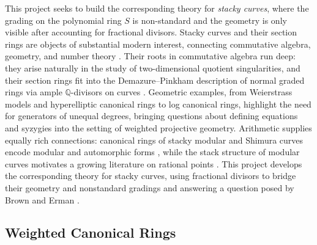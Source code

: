 \documentclass[11pt,reqno]{amsart}
\theoremstyle{remark}
\newcommand{\QQ}{\mathbb{Q}}
\begin{document}
This project seeks to build the corresponding theory for \emph{stacky curves}, where the grading on the polynomial ring $S$ is non-standard and the geometry is only visible after accounting for fractional divisors. Stacky curves and their section rings are objects of substantial modern interest, connecting commutative algebra, geometry, and number theory \cite{abramovichVistoli02,cadman07,AGV08,voightZurieckBrown22}. Their roots in commutative algebra run deep: they arise naturally in the study of two-dimensional quotient singularities, and their section rings fit into the Demazure--Pinkham description of normal graded rings via ample $\QQ$-divisors on curves \cite{pinkham77,demazure88,watanabe81}. Geometric examples, from Weierstrass models and hyperelliptic canonical rings to log canonical rings, highlight the need for generators of unequal degrees, bringing questions about defining equations and syzygies into the setting of weighted projective geometry. Arithmetic supplies equally rich connections: canonical rings of stacky modular and Shimura curves encode modular and automorphic forms \cite{voightZurieckBrown22}, while the stack structure of modular curves motivates a growing literature on rational points \cite{bhargavaPoonen20,nasserdenXiao20,kobinZB25}. This project develops the corresponding theory for stacky curves, using fractional divisors to bridge their geometry and nonstandard gradings and answering a question posed by Brown and Erman \cite[Question 7.7]{brownErman25}.
\subsection{Weighted Canonical Rings}\label{subsec:weighted-canonical}
\end{document}
